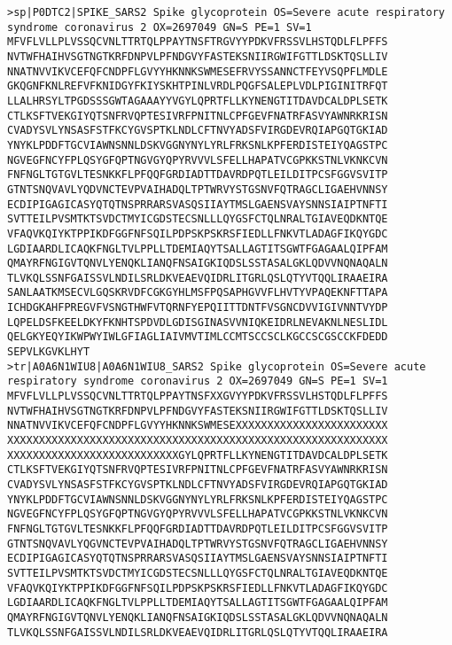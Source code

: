 \begin{lstlisting}
>sp|P0DTC2|SPIKE_SARS2 Spike glycoprotein OS=Severe acute respiratory syndrome coronavirus 2 OX=2697049 GN=S PE=1 SV=1
MFVFLVLLPLVSSQCVNLTTRTQLPPAYTNSFTRGVYYPDKVFRSSVLHSTQDLFLPFFS
NVTWFHAIHVSGTNGTKRFDNPVLPFNDGVYFASTEKSNIIRGWIFGTTLDSKTQSLLIV
NNATNVVIKVCEFQFCNDPFLGVYYHKNNKSWMESEFRVYSSANNCTFEYVSQPFLMDLE
GKQGNFKNLREFVFKNIDGYFKIYSKHTPINLVRDLPQGFSALEPLVDLPIGINITRFQT
LLALHRSYLTPGDSSSGWTAGAAAYYVGYLQPRTFLLKYNENGTITDAVDCALDPLSETK
CTLKSFTVEKGIYQTSNFRVQPTESIVRFPNITNLCPFGEVFNATRFASVYAWNRKRISN
CVADYSVLYNSASFSTFKCYGVSPTKLNDLCFTNVYADSFVIRGDEVRQIAPGQTGKIAD
YNYKLPDDFTGCVIAWNSNNLDSKVGGNYNYLYRLFRKSNLKPFERDISTEIYQAGSTPC
NGVEGFNCYFPLQSYGFQPTNGVGYQPYRVVVLSFELLHAPATVCGPKKSTNLVKNKCVN
FNFNGLTGTGVLTESNKKFLPFQQFGRDIADTTDAVRDPQTLEILDITPCSFGGVSVITP
GTNTSNQVAVLYQDVNCTEVPVAIHADQLTPTWRVYSTGSNVFQTRAGCLIGAEHVNNSY
ECDIPIGAGICASYQTQTNSPRRARSVASQSIIAYTMSLGAENSVAYSNNSIAIPTNFTI
SVTTEILPVSMTKTSVDCTMYICGDSTECSNLLLQYGSFCTQLNRALTGIAVEQDKNTQE
VFAQVKQIYKTPPIKDFGGFNFSQILPDPSKPSKRSFIEDLLFNKVTLADAGFIKQYGDC
LGDIAARDLICAQKFNGLTVLPPLLTDEMIAQYTSALLAGTITSGWTFGAGAALQIPFAM
QMAYRFNGIGVTQNVLYENQKLIANQFNSAIGKIQDSLSSTASALGKLQDVVNQNAQALN
TLVKQLSSNFGAISSVLNDILSRLDKVEAEVQIDRLITGRLQSLQTYVTQQLIRAAEIRA
SANLAATKMSECVLGQSKRVDFCGKGYHLMSFPQSAPHGVVFLHVTYVPAQEKNFTTAPA
ICHDGKAHFPREGVFVSNGTHWFVTQRNFYEPQIITTDNTFVSGNCDVVIGIVNNTVYDP
LQPELDSFKEELDKYFKNHTSPDVDLGDISGINASVVNIQKEIDRLNEVAKNLNESLIDL
QELGKYEQYIKWPWYIWLGFIAGLIAIVMVTIMLCCMTSCCSCLKGCCSCGSCCKFDEDD
SEPVLKGVKLHYT
>tr|A0A6N1WIU8|A0A6N1WIU8_SARS2 Spike glycoprotein OS=Severe acute respiratory syndrome coronavirus 2 OX=2697049 GN=S PE=1 SV=1
MFVFLVLLPLVSSQCVNLTTRTQLPPAYTNSFXXGVYYPDKVFRSSVLHSTQDLFLPFFS
NVTWFHAIHVSGTNGTKRFDNPVLPFNDGVYFASTEKSNIIRGWIFGTTLDSKTQSLLIV
NNATNVVIKVCEFQFCNDPFLGVYYHKNNKSWMESEXXXXXXXXXXXXXXXXXXXXXXXX
XXXXXXXXXXXXXXXXXXXXXXXXXXXXXXXXXXXXXXXXXXXXXXXXXXXXXXXXXXXX
XXXXXXXXXXXXXXXXXXXXXXXXXXXGYLQPRTFLLKYNENGTITDAVDCALDPLSETK
CTLKSFTVEKGIYQTSNFRVQPTESIVRFPNITNLCPFGEVFNATRFASVYAWNRKRISN
CVADYSVLYNSASFSTFKCYGVSPTKLNDLCFTNVYADSFVIRGDEVRQIAPGQTGKIAD
YNYKLPDDFTGCVIAWNSNNLDSKVGGNYNYLYRLFRKSNLKPFERDISTEIYQAGSTPC
NGVEGFNCYFPLQSYGFQPTNGVGYQPYRVVVLSFELLHAPATVCGPKKSTNLVKNKCVN
FNFNGLTGTGVLTESNKKFLPFQQFGRDIADTTDAVRDPQTLEILDITPCSFGGVSVITP
GTNTSNQVAVLYQGVNCTEVPVAIHADQLTPTWRVYSTGSNVFQTRAGCLIGAEHVNNSY
ECDIPIGAGICASYQTQTNSPRRARSVASQSIIAYTMSLGAENSVAYSNNSIAIPTNFTI
SVTTEILPVSMTKTSVDCTMYICGDSTECSNLLLQYGSFCTQLNRALTGIAVEQDKNTQE
VFAQVKQIYKTPPIKDFGGFNFSQILPDPSKPSKRSFIEDLLFNKVTLADAGFIKQYGDC
LGDIAARDLICAQKFNGLTVLPPLLTDEMIAQYTSALLAGTITSGWTFGAGAALQIPFAM
QMAYRFNGIGVTQNVLYENQKLIANQFNSAIGKIQDSLSSTASALGKLQDVVNQNAQALN
TLVKQLSSNFGAISSVLNDILSRLDKVEAEVQIDRLITGRLQSLQTYVTQQLIRAAEIRA

\end{lstlisting}
